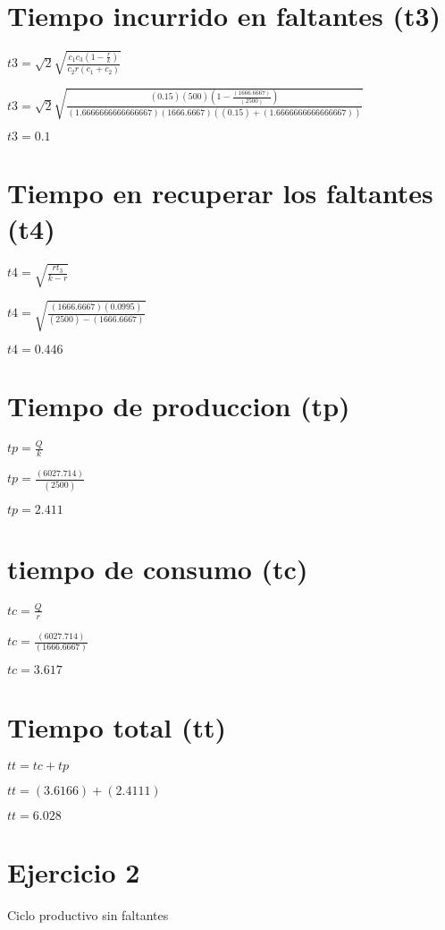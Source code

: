 \documentclass{article}
\newcommand*\rbreak{\par\noindent\linebreak}
\begin{document}
\section{\Huge \Huge Tiempo incurrido en faltantes (t3)}
\begin{huge}
$t3 = \sqrt{2} \sqrt{\frac{c_{1} c_{3} \left(1 - \frac{r}{k}\right)}{c_{2} r \left(c_{1} + c_{2}\right)}}$\rbreak
$t3 = \sqrt{2} \sqrt{\frac{(0.15) (500) \left(1 - \frac{ (1666.6667) }{ (2500) }\right)}{(1.6666666666666667)  (1666.6667)  \left((0.15) + (1.6666666666666667)\right)}}$\rbreak
$t3 = 0.1$
\end{huge}
\section{\Huge \Huge Tiempo en recuperar los faltantes (t4)}
\begin{huge}
$t4 = \sqrt{\frac{r t_{3}}{k - r}}$\rbreak
$t4 = \sqrt{\frac{ (1666.6667)  (0.0995)}{ (2500)  -  (1666.6667) }}$\rbreak
$t4 = 0.446$
\end{huge}
\section{\Huge \Huge Tiempo de produccion (tp)}
\begin{huge}
$tp = \frac{Q}{k}$\rbreak
$tp = \frac{ (6027.714) }{ (2500) }$\rbreak
$tp = 2.411$
\end{huge}
\section{\Huge \Huge tiempo de consumo (tc)}
\begin{huge}
$tc = \frac{Q}{r}$\rbreak
$tc = \frac{ (6027.714) }{ (1666.6667) }$\rbreak
$tc = 3.617$
\end{huge}
\section{\Huge \Huge Tiempo total (tt)}
\begin{huge}
$tt = tc + tp$\rbreak
$tt =  (3.6166)  +  (2.4111) $\rbreak
$tt = 6.028$
\end{huge}

\section{\Huge Ejercicio 2}
\Huge Ciclo productivo sin faltantes\rbreak
\end{document}
